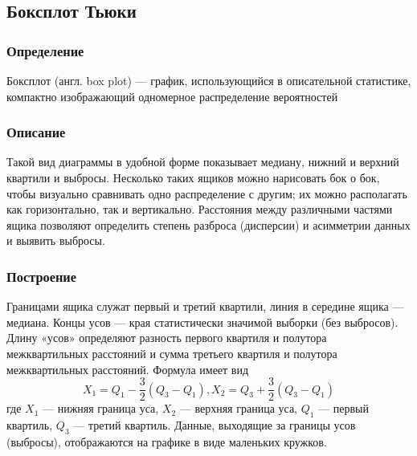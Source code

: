 \documentclass[a4paper]{article}
\begin{document}
\subsection{Боксплот Тьюки}
\subsubsection{Определение}
\noindent Боксплот (англ. box plot) — график, использующийся в описательной статистике, компактно изображающий одномерное распределение вероятностей

\subsubsection{Описание}
\noindent Такой вид диаграммы в удобной форме показывает медиану, нижний и верхний квартили и выбросы. Несколько таких ящиков можно нарисовать бок о бок, чтобы визуально сравнивать одно распределение с другим; их можно располагать как горизонтально, так и вертикально. Расстояния между различными частями ящика позволяют определить степень разброса (дисперсии) и асимметрии данных и выявить выбросы.

\subsubsection{Построение}
\noindent Границами ящика служат первый и третий квартили, линия в середине ящика — медиана. Концы усов — края статистически значимой выборки (без выбросов). Длину «усов» определяют разность первого квартиля и полутора межквартильных расстояний и сумма третьего квартиля и полутора межквартильных расстояний. Формула имеет вид
\begin{equation}\label{boxplot:mustache}
	{X_1 = Q_1-} \frac{3}{2}{(Q_3 - Q_1)},   {X_2 = Q_3+} \frac{3}{2}{(Q_3 - Q_1)}
\end{equation}
где $X_1$ — нижняя граница уса, $X_2$ — верхняя граница уса, $Q_1$ — первый квартиль, $Q_3$ — третий квартиль. Данные, выходящие за границы усов (выбросы), отображаются на графике в виде маленьких кружков.
\end{document}
